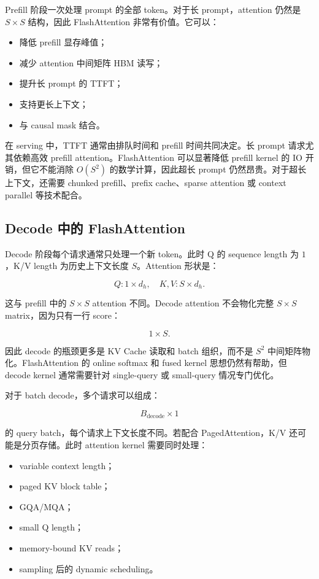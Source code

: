 Prefill 阶段一次处理 prompt 的全部 token。对于长 prompt，attention 仍然是 $S\times S$ 结构，因此 FlashAttention 非常有价值。它可以：

\begin{itemize}
\item 降低 prefill 显存峰值；
\item 减少 attention 中间矩阵 HBM 读写；
\item 提升长 prompt 的 TTFT；
\item 支持更长上下文；
\item 与 causal mask 结合。
\end{itemize}

在 serving 中，TTFT 通常由排队时间和 prefill 时间共同决定。长 prompt 请求尤其依赖高效 prefill attention。FlashAttention 可以显著降低 prefill kernel 的 IO 开销，但它不能消除 $O(S^2)$ 的数学计算，因此超长 prompt 仍然昂贵。对于超长上下文，还需要 chunked prefill、prefix cache、sparse attention 或 context parallel 等技术配合。

\subsection{Decode 中的 FlashAttention}
\label{subsec:flashattention-in-decode}

Decode 阶段每个请求通常只处理一个新 token。此时 Q 的 sequence length 为 $1$，K/V length 为历史上下文长度 $S$。Attention 形状是：

\[
Q: 1\times d_h,
\quad
K,V: S\times d_h.
\]

这与 prefill 中的 $S\times S$ attention 不同。Decode attention 不会物化完整 $S\times S$ matrix，因为只有一行 score：

\[
1\times S.
\]

因此 decode 的瓶颈更多是 KV Cache 读取和 batch 组织，而不是 $S^2$ 中间矩阵物化。FlashAttention 的 online softmax 和 fused kernel 思想仍然有帮助，但 decode kernel 通常需要针对 single-query 或 small-query 情况专门优化。

对于 batch decode，多个请求可以组成：

\[
B_{\mathrm{decode}}\times 1
\]

的 query batch，每个请求上下文长度不同。若配合 PagedAttention，K/V 还可能是分页存储。此时 attention kernel 需要同时处理：

\begin{itemize}
\item variable context length；
\item paged KV block table；
\item GQA/MQA；
\item small Q length；
\item memory-bound KV reads；
\item sampling 后的 dynamic scheduling。
\end{itemize}


